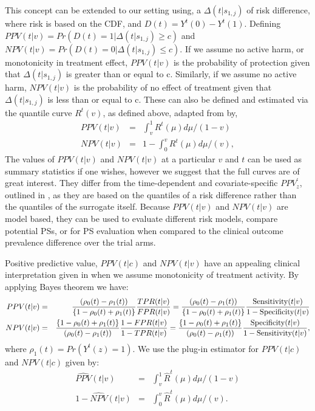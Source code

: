 \documentclass[times, 11pt]{article}
\begin{document}
This concept can be extended to our setting using, a $\Delta(t|s_{1,j})$ of risk difference, where risk is based on the CDF, and $D(t)=Y^t(0)-Y^t(1)$. Defining $PPV(t|v)=Pr(D(t)=1|\Delta(t|s_{1,j})\geq c)$ and $NPV(t|v)=Pr(D(t)=0|\Delta(t|s_{1,j}) \leq c)$. If we assume no active harm, or monotonicity in treatment effect, $PPV(t|v)$ is the probability of protection given that $\Delta(t|s_{1,j})$ is greater than or equal to c. Similarly, if we assume no active harm, $NPV(t|v)$ is the probability of no effect of treatment given that $\Delta(t|s_{1,j})$ is less than or equal to c. These can also be defined and estimated via the quantile curve $R^t(v)$, as defined above, adapted from \citep{Gu10} by,
\begin{eqnarray*}
PPV(t|v)&=&\int_{v}^{1}R^t(\mu)d\mu/(1-v)\\
NPV(t|v)&=&1-\int_{0}^{v}R^t(\mu)d\mu/(v), 
\end{eqnarray*}
The values of $PPV(t|v)$ and $NPV(t|v)$ at a particular $v$ and $t$ can be used as summary statistics if one wishes, however we suggest that the full curves are of great interest. They differ from the time-dependent and covariate-specific $PPV_z^{'}$, outlined in \citep{Gabriel13}, as they are based on the quantiles of a risk difference rather than the quantiles of the surrogate itself. Because $PPV(t|v)$ and $NPV(t|v)$ are model based, they can be used to evaluate different risk models, compare potential PSs, or for PS evaluation when compared to the clinical outcome prevalence difference over the trial arms.

Positive predictive value, $PPV(t|c)$ and $NPV(t|v)$ have an appealing clinical interpretation given in \citep{Gu10} when we assume monotonicity of treatment activity. By applying Bayes theorem we have:  
\begin{eqnarray*} 
PPV(t|v) &=& {(\rho_0(t) - \rho_1(t))\over \{1-\rho_0(t) + \rho_1(t)\}}{TPR(t|v) \over FPR(t|v)} = {(\rho_0(t) - \rho_1(t))\over \{1-\rho_0(t) + \rho_1(t)\}} {
\mbox{Sensitivity}(t|v) \over 1-\mbox{Specificity}(t|v)}\\
NPV(t|v) &=& {\{1-\rho_0(t) + \rho_1(t)\} \over (\rho_0(t) - \rho_1(t))}{1-FPR(t|v) \over 1-TPR(t|v)}={\{1-\rho_0(t) + \rho_1(t)\} \over (\rho_0(t) - \rho_1(t))}{\mbox{Specificity}(t|v) \over 1-\mbox{Sensitivity}(t|v)},
\end{eqnarray*}
where $\rho_1(t)=Pr(Y^t(z)=1)$. We use the plug-in estimator for $PPV(t|c)$ and $NPV(t|c)$ given by:
\begin{eqnarray*}
\widehat{PPV}(t|v)&=&\int_{v}^{1}\hat{R}^t(\mu)d\mu/(1-v)\\
1-\widehat{NPV}(t|v)&=&\int_{0}^{v}\hat{R}^t(\mu)d\mu/(v).
\end{eqnarray*}
\end{document}
